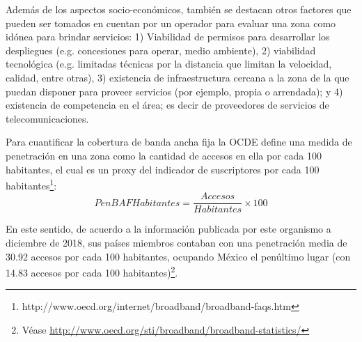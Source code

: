 \documentclass[9pt,twocolumn,twoside]{ilcss}
\begin{document}
Además de los aspectos socio-económicos, también se destacan otros factores que pueden ser tomados en cuentan por un operador para evaluar una zona como idónea para brindar servicios: 1) Viabilidad de permisos para desarrollar los despliegues (e.g. concesiones para operar, medio ambiente), 2) viabilidad tecnológica (e.g. limitadas técnicas por la distancia que limitan la velocidad, calidad, entre otras), 3) existencia de infraestructura cercana a la zona de la que puedan disponer para proveer servicios (por ejemplo, propia o arrendada); y 4) existencia de competencia en el área; es decir de proveedores de servicios de telecomunicaciones.
%	
%
%

Para cuantificar la cobertura de banda ancha fija la OCDE define una medida de penetración en una zona como la cantidad de accesos en ella por cada 100 habitantes, el cual es un proxy del indicador de suscriptores por cada 100 habitantes\footnote{http://www.oecd.org/internet/broadband/broadband-faqs.htm}:
\begin{equation}\label{pen_habitantes}
PenBAFHabitantes = \frac{Accesos }{Habitantes} \times 100 
\end{equation}

En este sentido, de acuerdo a la información publicada por este organismo a diciembre de 2018, sus países miembros contaban con una penetración media de 30.92 accesos por cada 100 habitantes, ocupando México el penúltimo lugar (con 14.83 accesos por cada 100 habitantes)\footnote{Véase \url{http://www.oecd.org/sti/broadband/broadband-statistics/}}.
\end{document}
